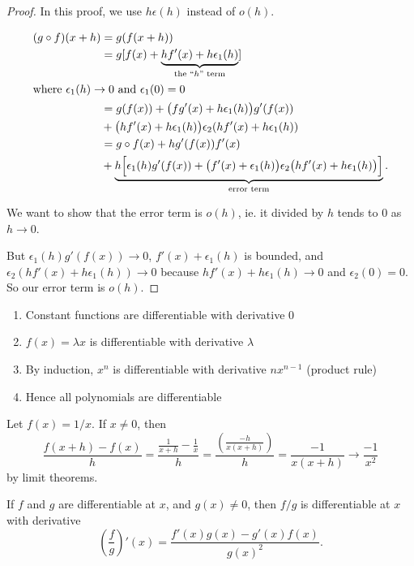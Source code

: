 \documentclass[a4paper]{article}
\begin{document}
\begin{proof}
  In this proof, we use $h\epsilon(h)$ instead of $o(h)$.

  \begin{align*}
    (g\circ f)(x + h) &= g(f(x + h))\\
    &= g[f(x) + \underbrace{hf'(x) + h\epsilon_1(h)}_{\text{the ``}h\text{'' term}}]\\
    \intertext{where $\epsilon_1(h) \to 0$ and $\epsilon_1(0) = 0$}
    &= g(f(x)) + \big(fg'(x) + h\epsilon_1(h)\big)g'(f(x))\\
    &+ \big(hf'(x) + h\epsilon_1(h)\big)\epsilon_2(hf'(x) + h\epsilon_1(h))\\
    &= g\circ f(x) + hg'(f(x))f'(x)\\
    &+ \underbrace{h\Big[\epsilon_1(h)g'(f(x)) + \big(f'(x) + \epsilon_1(h)\big)\epsilon_2\big(hf'(x) + h\epsilon_1(h)\big)\Big]}_{\text{error term}}.
  \end{align*}

  We want to show that the error term is $o(h)$, ie. it divided by $h$ tends to $0$ as $h\to 0$.

  But $\epsilon_1(h)g'(f(x))\to 0$, $f'(x) + \epsilon_1(h)$ is bounded, and $\epsilon_2(hf'(x) + h\epsilon_1(h))\to 0$ because $hf'(x) + h\epsilon_1(h) \to 0$ and $\epsilon_2(0) = 0$. So our error term is $o(h)$.
\end{proof}

\begin{eg}\leavevmode
  \begin{enumerate}
    \item Constant functions are differentiable with derivative $0$
    \item $f(x) = \lambda x$ is differentiable with derivative $\lambda$
    \item By induction, $x^n$ is differentiable with derivative $nx^{n - 1}$ (product rule)
    \item Hence all polynomials are differentiable
  \end{enumerate}
\end{eg}

\begin{eg}
  Let $f(x) = 1/x$. If $x\not = 0$, then
  \[
    \frac{f(x + h) - f(x)}{h} = \frac{\frac{1}{x + h} - \frac{1}{x}}{h} = \frac{\left(\frac{-h}{x(x + h)}\right)}{h} = \frac{-1}{x(x + h)} \to \frac{-1}{x^2}
  \]
  by limit theorems.
\end{eg}

\begin{lemma}
  If $f$ and $g$ are differentiable at $x$, and $g(x) \not = 0$, then $f/g$ is differentiable at $x$ with derivative
  \[
    \left(\frac{f}{g}\right)'(x) = \frac{f'(x)g(x) - g'(x)f(x)}{g(x)^2}.
  \]
\end{lemma}
\end{document}
